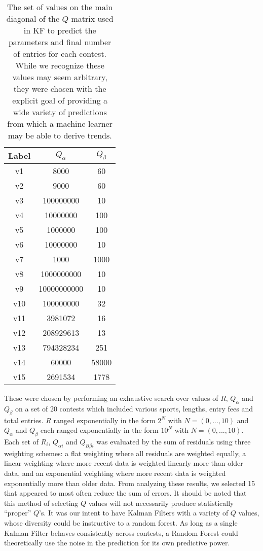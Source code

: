 \begin{table}
\begin{center}
\begin{tabular}{| c | c | c |}
\hline
 \textbf{Label} & \textbf{$Q_{\alpha}$} & \textbf{$Q_{\beta}$} \\ 
 \hline
 v1 & 8000 & 60 \\  
 \hline
 v2 & 9000 & 60 \\
 \hline
 v3 & 100000000 & 10 \\
 \hline
 v4 & 10000000 & 100 \\
 \hline
 v5 & 1000000 & 100 \\
 \hline
 v6 & 10000000 & 10 \\
 \hline
 v7 & 1000 & 1000 \\
 \hline
 v8 & 1000000000 & 10 \\
 \hline
 v9 & 10000000000 & 10 \\
 \hline
 v10 & 100000000 & 32 \\
 \hline
 v11 & 3981072 & 16 \\
 \hline
 v12 & 208929613 & 13 \\
 \hline
 v13 & 794328234 & 251 \\
 \hline
 v14 & 60000 & 58000 \\
 \hline
 v15 & 2691534 & 1778 \\
 \hline
\end{tabular}
\caption{The set of values on the main diagonal of the $Q$ matrix used in KF to predict the parameters and final number of entries for each contest. While we recognize these values may seem arbitrary, they were chosen with the explicit goal of providing a wide variety of predictions from which a machine learner may be able to derive trends.}
\end{center}
\end{table}

These were chosen by performing an exhaustive search over values of $R$, $Q_{\alpha}$ and $Q_{\beta}$ on a set of 20 contests which included various sports, lengths, entry fees and total entries. $R$ ranged exponentially in the form $2^{N}$ with $N=(0,...,10)$ and $Q_{\alpha}$ and $Q_{\beta}$ each ranged exponentially in the form $10^{N}$ with $N=(0,...,10)$. Each set of $R_{i}$, $Q_{\alpha i}$ and $Q_{B\beta i}$ was evaluated by the sum of residuals using three weighting schemes: a flat weighting where all residuals are weighted equally, a linear weighting where more recent data is weighted linearly more than older data, and an exponential weighting where more recent data is weighted exponentially more than older data. From analyzing these results, we selected 15 that appeared to most often reduce the sum of errors. It should be noted that this method of selecting $Q$ values will not necessarily produce statistically ``proper'' $Q$'s. It was our intent to have Kalman Filters with a variety of $Q$ values, whose diversity could be instructive to a random forest. As long as a single Kalman Filter behaves consistently across contests, a Random Forest could theoretically use the noise in the prediction for its own predictive power.

